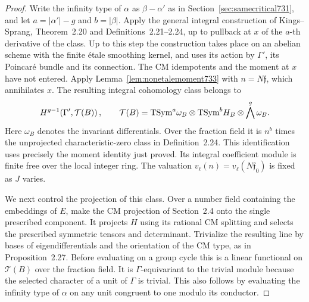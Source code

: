 \documentclass[a4paper,11pt]{article}
\theoremstyle{definition}
\theoremstyle{remark}
\numberwithin{equation}{section}
\begin{document}
\begin{proof}
Write the infinity type of \(\alpha\) as \(\beta-\alpha'\) as in
Section~\ref{sec:samecritical731}, and let \(a=|\alpha'|-g\) and
\(b=|\beta|\). Apply the general integral construction of
Kings--Sprang, Theorem~2.20 and Definitions~2.21--2.24, up to
pullback at \(x\) of the \(a\)-th derivative of the class. Up to
this step the construction takes place on an abelian scheme with
the finite étale smoothing kernel, and uses its action by \(\Gamma'\),
its Poincaré bundle and its connection. The CM idempotents and the
moment at \(x\) have not entered. Apply
Lemma~\ref{lem:nonetalemoment733} with \(n=N\mathfrak f\), which
annihilates \(x\). The resulting integral cohomology class belongs to
\[
 H^{g-1}\!\left(\Gamma',\mathcal T(B)\right),\qquad
 \mathcal T(B)={\rm TSym}^a\omega_B\otimes
               {\rm TSym}^b H_B\otimes\bigwedge^g\omega_B .
\]
Here \(\omega_B\) denotes the invariant differentials.
Over the fraction field it is \(n^b\) times the unprojected
characteristic-zero class in Definition~2.24. This identification
uses precisely the moment identity just proved. Its integral
coefficient module is finite free over the local integer ring.
The valuation \(v_\ell(n)=v_\ell(N\mathfrak f_0)\) is fixed as
\(J\) varies. \cite{II-II-kingssprang731}

We next control the projection of this class. Over a number field
containing the embeddings of \(E\), make the CM projection of
Section~2.4 onto the single prescribed component. It projects \(H\)
using its rational CM splitting and selects the prescribed
symmetric tensors and determinant. Trivialize the resulting line
by bases of eigendifferentials and the orientation of the CM type,
as in Proposition~2.27. Before evaluating on a group cycle this
is a linear functional on \(\mathcal T(B)\) over the fraction
field. It is \(\Gamma\)-equivariant to the trivial module because
the selected character of a unit of \(\Gamma\) is trivial. This
also follows by evaluating the infinity type of \(\alpha\) on any
unit congruent to one modulo its conductor.


\end{proof}
\end{document}
